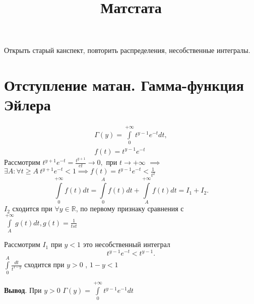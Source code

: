 \documentclass[14pt]{extarticle}
\title{Матстата}
\author{}
\date{}
\begin{document}
	\maketitle
	\section{}
	Открыть старый канспект, повторить распределения, несобственные интегралы.
	\section{Отступление матан. Гамма-функция Эйлера}
	\begin{eqnarray}
		\Gamma(y) = \int\limits_{0}^{+\infty}  t^{y-1}e^{-t}dt,\\ f(t) = t^{y-1}e^{-t}
	\end{eqnarray}
	Рассмотрим $t^{y+1} e^{-t} = \frac{t^{y+1}}{et} \to 0,$ при $t \to + \infty$  $\implies$  $\exists  A: \forall t \ge  A ~ t^{y+1} e^{-t} < 1 \implies f(t) = t^{y-1} e^{-t} < \frac{1}{t^2}$
	\[
	\int\limits_{0}^{+\infty}  f(t) dt = \int\limits_{0}^{A} f(t)  dt + \int\limits_{A}^{+\infty}  f(t) dt = I_1 + I_2
	.\] 
	$I_2$ сходится при $\forall  y \in \mathbb{R}$, по первому признаку сравнения с $\int\limits_{A}^{+\infty} g(t) dt , g(t) = \frac{1}{tst}  $
	
	Рассмотрим $I_1$  при $y < 1$ это несобственный интеграл
	 \[
		 t^{y-1}e^{-t}< t^{y-1}
	.\] 
	$\int\limits_{0}^{A} \frac{dt}{t^{1- y}}  $ сходится при $y > 0$ ,  $1- y < 1$
	
	\textbf{Вывод}. При $y>0$  $\Gamma(y) =  \int\limits_{0}^{+\infty} t^{y-1}e^{-1} dt $
	
\end{document}
